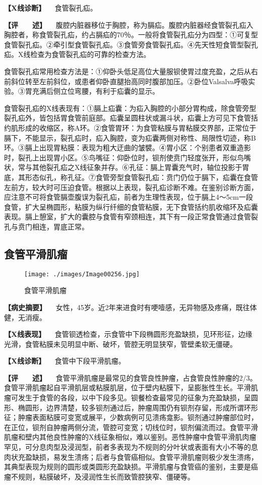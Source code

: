 \textbf{【X线诊断】} 　食管裂孔疝。

\textbf{【评　　述】}
　腹腔内脏器移位于胸腔，称为膈疝。腹腔内脏器经食管裂孔疝入胸腔者，称食管裂孔疝，约占膈疝的70％。一般将食管裂孔疝分为四型：①可复型食管裂孔疝。②牵引型食管裂孔疝。③食管旁食管裂孔疝。④先天性短食管型裂孔疝。X线检查为食管裂孔疝的可靠的检查方法。

食管裂孔疝常用检查方法是：①仰卧头低足高位大量服钡使胃过度充盈，之后从右前斜位转至左前斜位，或患者仰卧直腿抬高同时腹部加压。②卧位Valsalva呼吸实验。③胃充满后侧立位弯腰，有利于疝囊的显示。

食管裂孔疝的X线表现有：①膈上疝囊：为疝入胸腔的小部分胃构成，除食管旁型裂孔疝外，皆包括胃食管前庭部。疝囊呈圆柱状或漏斗状，疝囊上方可见下食管括约肌形成的收缩区，称A环。②食管胃环：为食管粘膜与胃粘膜交界部，正常位于膈下，不能显示，裂孔疝时，疝入胸腔，变为疝囊两侧对称性、局限性切迹，称B环。③膈上出现胃粘膜：表现为粗大迂曲的皱襞。④胃小区：个别患者双重造影时，裂孔上出现胃小区。⑤鸟嘴征：仰卧位时，钡剂使贲门轻度张开，形似鸟嘴状，常与其他裂孔疝之X线征象并存。⑥孔征：膈上胃囊充气时，轴位投影于胃底，其形态似孔，称孔征。⑦食管旁型食管裂孔疝：贲门仍位于膈下，疝囊在食管左前方，较大时可压迫食管。根据以上表现，裂孔疝诊断不难。在鉴别诊断方面，应注意不可将食管膈壶腹误为裂孔疝，前者为生理性表现，位于膈上4～5cm一段食管，扩大呈椭圆形，粘膜为纵行纤细的食管粘膜，无下食管括约肌收缩环及疝囊表现。膈上憩室，扩大的囊腔与食管有窄颈相连，其下有一段正常食管通过食管裂孔与贲门相连，胃底正常。

\subsection{食管平滑肌瘤}

\begin{figure}[!htbp]
 \centering
 \texttt{[image: ./images/Image00256.jpg]}
 \captionsetup{justification=centering}
 \caption{食管平滑肌瘤}
 \label{fig5-2-13}
  \end{figure} 

\textbf{【病史摘要】}
　女性，45岁。近2年来进食时有哽噎感，无异物感及疼痛，既往体健，无消瘦。

\textbf{【X线表现】}
　食管钡透检查，示食管中下段椭圆形充盈缺损，见环形征，边缘光滑，食管粘膜未见明显中断、破坏，管腔无明显狭窄，管壁柔软无僵硬。

\textbf{【X线诊断】} 　食管中下段平滑肌瘤。

\textbf{【评　　述】}
　食管平滑肌瘤是最常见的食管良性肿瘤，占食管良性肿瘤的2/3。食管平滑肌瘤起自平滑肌层或粘膜肌层，位于壁内粘膜下，呈膨胀性生长。平滑肌瘤可发生于食管的各段，以中下段多见。钡餐检查最常见的征象为充盈缺损，呈圆形、椭圆形，边界清楚，较多钡剂通过后，肿瘤周围仍有钡剂存留，形成所谓环形征；肿瘤表面粘膜可变宽或展平，少数病例可见溃疡龛影。钡剂通过肿瘤部位时，在正位，钡剂自肿瘤两侧分流，管腔可变宽；切线位时，钡剂偏流而过。食管平滑肌瘤和壁内其他良性肿瘤的X线征象相似，难以鉴别。恶性肿瘤中食管平滑肌肉瘤罕见，可分息肉型及浸润型，前者多表现为不规则的分叶状或表面有大小不等的息肉状充盈缺损，易发生溃疡；后者与食管癌相似。食管平滑肌瘤则极少发生溃疡，其典型表现为规则的圆形或类圆形充盈缺损。平滑肌瘤与食管癌的鉴别，主要是癌瘤不规则，粘膜破坏，及浸润性生长而致管腔狭窄、僵硬等。


